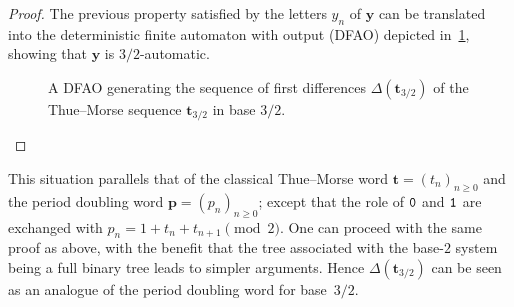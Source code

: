 \documentclass[12pt,reqno]{article}
\begin{document}
\begin{proof}
The previous property satisfied by the letters $y_n$ of $\mathbf{y}$ can be translated into the deterministic finite automaton with output (DFAO) depicted in~\cref{Fig: DFAOy},  showing that $\mathbf{y}$ is $3/2$-automatic.
\begin{figure}[htb]
\begin{center}
\end{center}
\caption{A DFAO generating the sequence of first differences $\Delta(\mathbf{t}_{3/2})$ of the Thue--Morse sequence $\mathbf{t}_{3/2}$ in base $3/2$.}
\label{Fig: DFAOy}
\end{figure}
\end{proof}

\begin{remark}
  This situation parallels that of the classical Thue--Morse word $\mathbf{t}=(t_n)_{n\ge 0}$ and the period doubling word $\mathbf{p}=(p_n)_{n\ge 0}$; except that the role of ${\tt 0}$ and ${\tt 1}$ are exchanged with $p_n=1+t_n+t_{n+1}\pmod{2}$. One can proceed with the same proof as above,  with the benefit that the tree associated with the base-$2$ system being a full binary tree leads to simpler arguments. Hence $\Delta(\mathbf{t}_{3/2})$ can be seen as an analogue of the period doubling word for base~$3/2$.
\end{remark}
\end{document}
